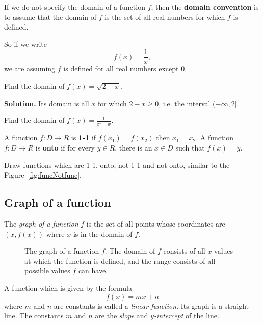 \documentclass[../main.tex]{subfiles}
\begin{document}
If we do not specify the domain of a function $f$, then the \textbf{domain convention} is to assume that the domain of $f$ is the set of all real numbers for which $f$ is defined.

So if we write
\[
  f(x)=\frac{1}{x},
\]
we are assuming $f$ is defined for all real numbers except $0$.


\begin{example}
  Find the domain of $f(x) = \sqrt{2-x}$.

  \textbf{Solution.} Its domain is all $x$ for which $2-x \ge 0$, i.e. the interval $(-\infty, 2]$.
\end{example}

\begin{example}
    Find the domain of $f(x) = \frac{1}{x^2 - x}$.
\end{example}

A function $f: D \to R$ is \textbf{1-1} if $f(x_1) = f(x_2)$ then $x_1=x_2$. A function $f: D \to R$ is \textbf{onto} if for every $y \in R$, there is an $x \in D$ such that $f(x) = y$.

\begin{example}
  Draw functions which are 1-1, onto, not 1-1 and not onto,  similar to the Figure~\ref{fig:funcNotfunc}.
\end{example}

\subsection*{Graph of a function}
The \emph{graph of a function} $f$ is the set of all points whose coordinates are $(x, f(x))$ where $x$ is in the domain of $f$.

\begin{figure}[th]
  \centering
  
  \caption{The graph of a function $f$. The domain of $f$ consists
  of all $x$ values at which the function is defined, and the range consists
  of all possible values $f$ can have.}
  \label{fig:01graphOFf}
\end{figure}



\begin{example}
  A function which is given by the formula
  \[
    f(x) = mx + n
  \]
  where $m$ and $n$ are constants is called a \emph{linear function}. Its graph is a straight line. The constants $m$ and $n$ are the \emph{slope} and \emph{$y$-intercept} of the line.
\end{example}
\end{document}
